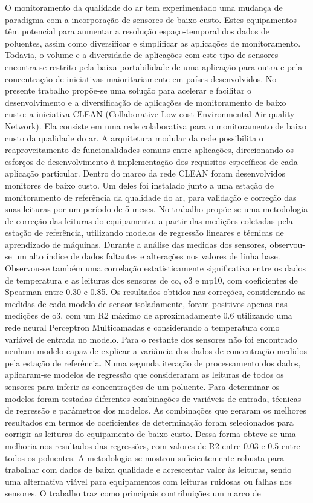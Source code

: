 \begin{resumo}
	\SingleSpacing
	O monitoramento da qualidade do ar tem experimentado uma mudança de paradigma com a incorporação de sensores de baixo custo. Estes equipamentos têm potencial para aumentar a resolução espaço-temporal dos dados de poluentes, assim como diversificar e simplificar as aplicações de monitoramento. Todavia, o volume e a diversidade de aplicações com este tipo de sensores encontra-se restrito pela baixa portabilidade de uma aplicação para outra e pela concentração de iniciativas maioritariamente em países desenvolvidos. No presente trabalho propõe-se uma solução para acelerar e facilitar o desenvolvimento e a diversificação de aplicações de monitoramento de baixo custo: a iniciativa CLEAN (Collaborative Low-cost Environmental Air quality Network). Ela consiste em uma rede colaborativa para o monitoramento de baixo custo da qualidade do ar. A arquitetura modular da rede possibilita o reaproveitamento de funcionalidades comuns entre aplicações, direcionando os esforços de desenvolvimento à implementação dos requisitos específicos de cada aplicação particular. Dentro do marco da rede CLEAN foram desenvolvidos monitores de baixo custo. Um deles foi instalado junto a uma estação de monitoramento de referência da qualidade do ar, para validação e correção das suas leituras por um período de 5 meses. No trabalho propõe-se uma metodologia de correção das leituras do equipamento, a partir das medições coletadas pela estação de referência, utilizando modelos de regressão lineares e técnicas de aprendizado de máquinas. Durante a análise das medidas dos sensores, observou-se um alto índice de dados faltantes e alterações nos valores de linha base. Observou-se também uma correlação estatisticamente significativa entre os dados de temperatura e as leituras dos sensores de \acrshort{co}, \acrshort{o3} e \acrshort{mp10}, com coeficientes de Spearman entre 0.30 e 0.85. Os resultados obtidos nas correções, considerando as medidas de cada modelo de sensor isoladamente, foram positivos apenas nas medições de \acrshort{o3}, com um R2 máximo de aproximadamente 0.6 utilizando uma rede neural Perceptron Multicamadas e considerando a temperatura como variável de entrada no modelo. Para o restante dos sensores não foi encontrado nenhum modelo capaz de explicar a variância dos dados de concentração medidos pela estação de referência. Numa segunda iteração de processamento dos dados, aplicaram-se modelos de regressão que consideraram as leituras de todos os sensores para inferir as concentrações de um poluente. Para determinar os modelos foram testadas diferentes combinações de variáveis de entrada, técnicas de regressão e parâmetros dos modelos. As combinações que geraram os melhores resultados em termos de coeficientes de determinação foram selecionados para corrigir as leituras do equipamento de baixo custo. Dessa forma obteve-se uma melhoria nos resultados das regressões, com valores de R2 entre 0.03 e 0.5 entre todos os poluentes. A metodologia se mostrou suficientemente robusta para trabalhar com dados de baixa qualidade e acrescentar valor às leituras, sendo uma alternativa viável para equipamentos com leituras ruidosas ou falhas nos sensores. O trabalho traz como principais contribuições um marco de 
\end{resumo}
